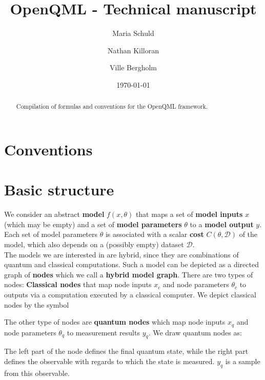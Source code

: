\documentclass[aps,pra,10pt,twocolumn,groupedaddress,nofootinbib]{revtex4-1}
\theoremstyle{plain}
\newcommand{\ket}[1]{\ensuremath{\left| #1 \right \rangle}}
\newcommand{\x}{\hat{x}}
\begin{document}
\title{OpenQML - Technical manuscript}
\author{Maria Schuld}
\author{Nathan Killoran}
\author{Ville Bergholm}


\date{\today}

\begin{abstract}
Compilation of formulas and conventions for the OpenQML framework.
\end{abstract}

\maketitle


\section{Conventions}
\section{Basic structure}

We consider an abstract \textbf{model} $f(x, \theta)$ 
that maps a set of \textbf{model inputs} $x$ (which may be empty) and a set of \textbf{model parameters} $\theta$ to a \textbf{model output} $y$. \\

Each set of model parameters $\theta$ is associated with a scalar \textbf{cost} $C(\theta, \mathcal{D})$ of the model, which also depends on a (possibly empty) dataset $\mathcal{D}$.\\

The models we are interested in are hybrid, since they are combinations of quantum and classical computations. Such a model can be depicted as a directed graph of \textbf{nodes} which we call a \textbf{hybrid model graph}. There are two types of nodes: \textbf{Classical nodes} that map node inputs $x_c$ and node parameters $\theta_c$ to outputs via a computation executed by a classical computer. We depict classical nodes by the symbol
\begin{figure}[h]
\centering
{}
\end{figure}
The other type of nodes are \textbf{quantum nodes} which map node inputs $x_q$ and node parameters $\theta_q$ to measurement results $y_q$.
We draw quantum nodes as:
\begin{figure}[h]
\centering
{}
\end{figure}
The left part of the node defines the final quantum state, while the right part defines the observable with regards to which the state is measured. $y_q$ is a sample from this observable.\\
\end{document}
